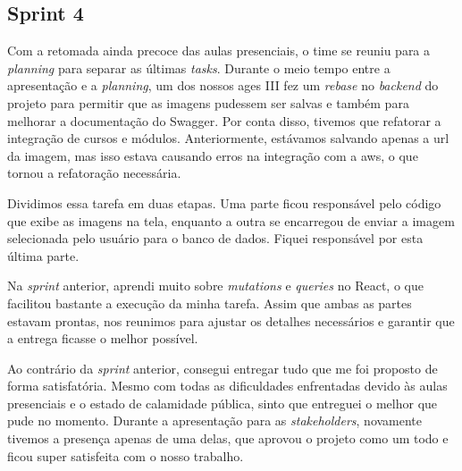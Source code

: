 \subsection{Sprint 4}

Com a retomada ainda precoce das aulas presenciais, o time se reuniu para a \textit{planning} para separar as últimas \textit{tasks}. Durante o meio tempo entre a apresentação e a \textit{planning}, um dos nossos \ac{ages} III fez um \textit{rebase} no \textit{backend} do projeto para permitir que as imagens pudessem ser salvas e também para melhorar a documentação do Swagger. Por conta disso, tivemos que refatorar a integração de cursos e módulos. Anteriormente, estávamos salvando apenas a \ac{url} da imagem, mas isso estava causando erros na integração com a \ac{aws}, o que tornou a refatoração necessária.

Dividimos essa tarefa em duas etapas. Uma parte ficou responsável pelo código que exibe as imagens na tela, enquanto a outra se encarregou de enviar a imagem selecionada pelo usuário para o banco de dados. Fiquei responsável por esta última parte.

Na \textit{sprint} anterior, aprendi muito sobre \textit{mutations} e \textit{queries} no React, o que facilitou bastante a execução da minha tarefa. Assim que ambas as partes estavam prontas, nos reunimos para ajustar os detalhes necessários e garantir que a entrega ficasse o melhor possível.

Ao contrário da \textit{sprint} anterior, consegui entregar tudo que me foi proposto de forma satisfatória. Mesmo com todas as dificuldades enfrentadas devido às aulas presenciais e o estado de calamidade pública, sinto que entreguei o melhor que pude no momento. Durante a apresentação para as \textit{stakeholders}, novamente tivemos a presença apenas de uma delas, que aprovou o projeto como um todo e ficou super satisfeita com o nosso trabalho.